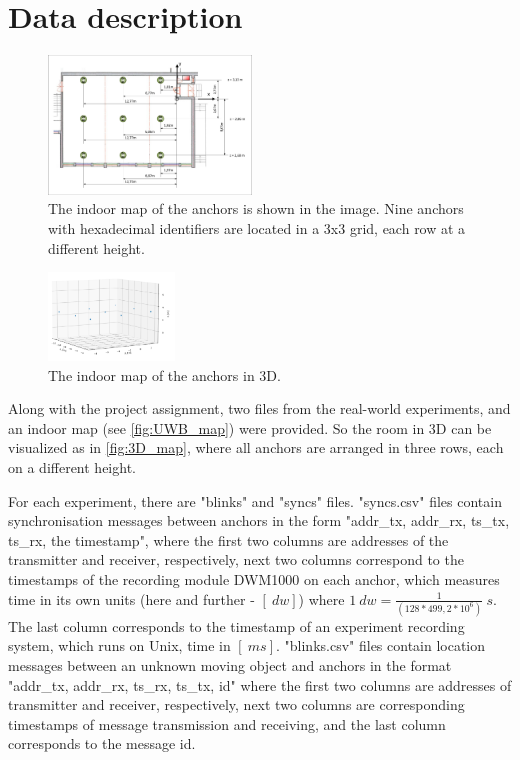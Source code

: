\documentclass[journal]{IEEEtran}
\begin{document}
\section{Data description}
\label{sec:data_desc}
\begin{figure}[ht]
    \centering
    \includegraphics[width=0.48\textwidth]{graphics/UWB_map.pdf}
    \caption{The indoor map of the anchors is shown in the image. Nine anchors with hexadecimal identifiers are located in a 3x3 grid, each row at a different height.}
    \label{fig:UWB_map}
\end{figure}
\begin{figure}[ht]
    \centering
    \includegraphics[width=0.30\textwidth]{graphics/room3D.png}
    \caption{The indoor map of the anchors in 3D.}
    \label{fig:3D_map}
\end{figure}

Along with the project assignment, two files from the real-world experiments, and an indoor map (see \autoref{fig:UWB_map}) were provided. So the room in 3D can be visualized as in \autoref{fig:3D_map}, where all anchors are arranged in three rows, each on a different height.

For each experiment, there are "blinks" and "syncs" files.
"syncs.csv" files contain synchronisation messages between anchors in the form "addr\_tx, addr\_rx, ts\_tx, ts\_rx, the timestamp",  where the first two columns are addresses of the transmitter and receiver, respectively, next two columns correspond to the timestamps of the recording module DWM1000 on each anchor, which measures time in its own units (here and further - $[\SI{}{dw}]$) where $\SI{1}{dw} = \frac{1}{(128*499,2*10^6)}\SI{}{s}$. 
The last column corresponds to the timestamp of an experiment recording system, which runs on Unix, time in $[\SI{}{ms}]$.
"blinks.csv" files contain location messages between an unknown moving object and anchors in the format "addr\_tx, addr\_rx, ts\_rx, ts\_tx, id" where the first two columns are addresses of transmitter and receiver, respectively, next two columns are corresponding timestamps of message transmission and receiving, and the last column corresponds to the message id.
\end{document}
